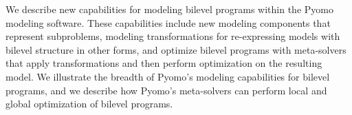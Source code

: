 We describe new capabilities for modeling bilevel programs within
the Pyomo modeling software.  These capabilities include new modeling
components that represent subproblems, modeling transformations for
re-expressing models with bilevel structure in other forms, and
optimize bilevel programs with meta-solvers that apply transformations
and then perform optimization on the resulting model.  We illustrate
the breadth of Pyomo's modeling capabilities for bilevel programs,
and we describe how Pyomo's meta-solvers can perform local and
global optimization of bilevel programs.

